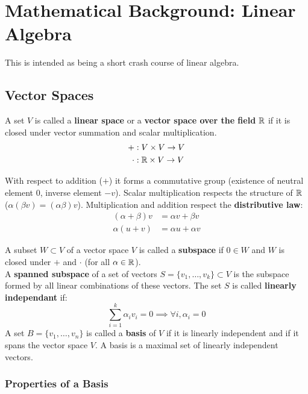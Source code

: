 \section[Linear Algebra]{Mathematical Background: Linear Algebra}
\label{sec:linear_algebra}

This is intended as being a short crash course of linear algebra.

\subsection{Vector Spaces}
\label{sub:vector_spaces}

A set $V$ is called a \textbf{linear space}
or a \textbf{vector space over the field} $\mathbb{R}$
if it is closed under vector summation and scalar multiplication.
\begin{align*}
	+ &: V \times V \rightarrow V \\
	\cdot &: \mathbb{R} \times V \rightarrow V 
\end{align*}

\noindent
With respect to addition ($+$) it forms a commutative group
(existence of neutral element $0$, inverse element $-v$).
Scalar multiplication respects the structure of $\mathbb{R}$ 
($\alpha(\beta v) = (\alpha \beta )v$).
Multiplication and addition respect the \textbf{distributive law}:
\begin{align*}
	( \alpha + \beta )v &= \alpha v + \beta v \\
	\alpha (u + v) & = \alpha u + \alpha v
\end{align*}

\noindent
A subset $W \subset V$ of a vector space $V$
is called a \textbf{subspace} if $0 \in W$ and
$W$ is closed under $+$ and $\cdot$ (for all $\alpha \in \mathbb{R}$).\\

\noindent
A \textbf{spanned subspace} of a set of vectors
$S = \{v_1, \hdots, v_k\} \subset V$ is the subspace
formed by all linear combinations of these vectors.
The set $S$ is called \textbf{linearly independant} if:
\[
	\sum_{i=1}^k \alpha_i v_i = 0 \implies \forall i, \alpha_i = 0
\]
\noindent
A set $B = \{v_1, \hdots, v_n\}$ is called
a \textbf{basis} of $V$ if it is linearly independent and if it
spans the vector space $V$.
A basis is a maximal set of linearly independent vectors.


\subsubsection{Properties of a Basis}
\label{ssub:properties_of_a_basis}

